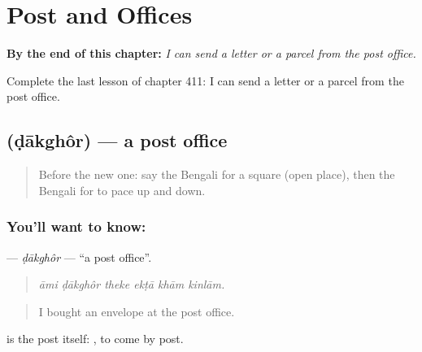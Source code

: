 
\chapter{Post and Offices}
\label{ch:bn-post-and-offices}

\begin{chapteropening}
\textbf{By the end of this chapter:} \emph{I can send a letter or a parcel from the post office.}

Complete the last lesson of chapter 411: I can send a letter or a parcel from the post office.
\end{chapteropening}

\section[\texorpdfstring{\bn{ডাকঘর} (ḍākghôr)}{ডাকঘর (ḍākghôr)}]{ (ḍākghôr) — a post office}

\label{lesson:BN-C411-dakghor}



\begin{quote}
Before the new one: say the Bengali for a square (open place), then the Bengali for to pace up and down.
\end{quote}

\subsection*{You'll want to know: }
\textbf{} — \emph{ḍākghôr} — \textquotedblleft{}a post office\textquotedblright{}.

\begin{quote}
     
\end{quote}

\begin{quote}
\emph{āmi ḍākghôr theke ekṭā khām kinlām.}
\end{quote}

\begin{quote}
I bought an envelope at the post office.
\end{quote}

 is the post itself:  , to come by post.

